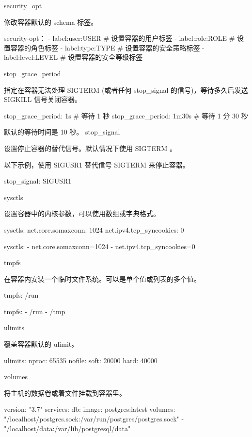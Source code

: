 security_opt

修改容器默认的 schema 标签。

security-opt：
  - label:user:USER   # 设置容器的用户标签
  - label:role:ROLE   # 设置容器的角色标签
  - label:type:TYPE   # 设置容器的安全策略标签
  - label:level:LEVEL  # 设置容器的安全等级标签

stop_grace_period

指定在容器无法处理 SIGTERM (或者任何 stop_signal 的信号)，等待多久后发送 SIGKILL 信号关闭容器。

stop_grace_period: 1s # 等待 1 秒
stop_grace_period: 1m30s # 等待 1 分 30 秒 

默认的等待时间是 10 秒。
stop_signal

设置停止容器的替代信号。默认情况下使用 SIGTERM 。

以下示例，使用 SIGUSR1 替代信号 SIGTERM 来停止容器。

stop_signal: SIGUSR1

sysctls

设置容器中的内核参数，可以使用数组或字典格式。

sysctls:
  net.core.somaxconn: 1024
  net.ipv4.tcp_syncookies: 0

sysctls:
  - net.core.somaxconn=1024
  - net.ipv4.tcp_syncookies=0

tmpfs

在容器内安装一个临时文件系统。可以是单个值或列表的多个值。

tmpfs: /run

tmpfs:
  - /run
  - /tmp

ulimits

覆盖容器默认的 ulimit。

ulimits:
  nproc: 65535
  nofile:
    soft: 20000
    hard: 40000

volumes

将主机的数据卷或着文件挂载到容器里。

version: "3.7"
services:
  db:
    image: postgres:latest
    volumes:
      - "/localhost/postgres.sock:/var/run/postgres/postgres.sock"
      - "/localhost/data:/var/lib/postgresql/data"